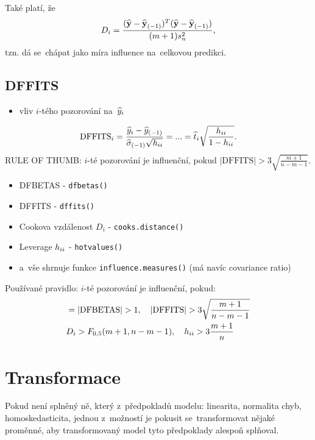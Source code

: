 \begin{remark}
	Také platí, že
	 $$ D_i = \frac{(\widehat{\textbf{y}}-{\widehat{\textbf{y}}_{(-1)}})^T(\widehat{\textbf{y}}-{\widehat{\textbf{y}}_{(-1)}})}{(m+1)s_n^2}, $$
	tzn. dá se~chápat jako míra influence na~celkovou predikci.
\end{remark}

\subsection*{DFFITS}
\begin{itemize}
	\item vliv $i$-tého pozorování na~$\widehat{y}_i$
\end{itemize}
 $$ \mathrm{DFFITS}_i = \frac{\widehat{y}_i-{\widehat{y}_{(-1)}}}{{\widehat{{\sigma}}_{(-1)}}\sqrt{h_{ii}}} = ... = \widehat{t}_i\sqrt{\frac{h_{ii}}{1-h_{ii}}}. $$
RULE OF THUMB: $i$-té pozorování je influenční, pokud $|\mathrm{DFFITS}|>3\sqrt{\frac{m+1}{n-m-1}}$.

\begin{remark}
\begin{itemize}
	\item DFBETAS - \verb|dfbetas()|
	\item DFFITS - \verb|dffits()|
	\item Cookova vzdálenost $D_i$ - \verb|cooks.distance()|
	\item Leverage $h_{ii}$ - \verb|hotvalues()|
	\item a~vše shrnuje funkce \verb|influence.measures()| (má navíc covariance ratio)
\end{itemize}

Používané pravidlo: $i$-té pozorování je influenční, pokud:
\begin{align*}
	& = | \mathrm{DFBETAS} | > 1, \quad |\mathrm{DFFITS}| > 3 \sqrt{\frac{m+1}{n-m-1}} \\
	& D_i > F_{0,5}(m+1,n-m-1), \quad h_{ii} > 3 \frac{m+1}{n}
\end{align*}
\end{remark}

\section{Transformace}

Pokud není splněný ně, který z~předpokladů modelu: linearita, normalita chyb, homoskedasticita, jednou z~možností je pokusit se~transformovat nějaké proměnné, aby transformovaný model tyto předpoklady alespoň  splňoval.

